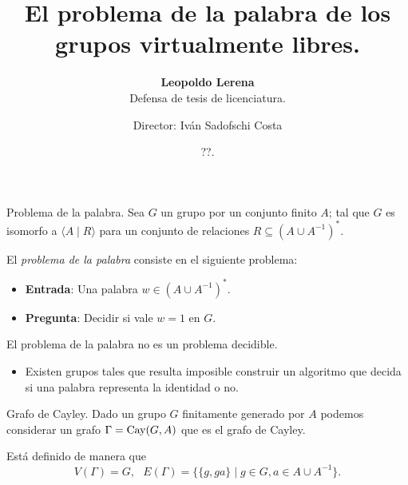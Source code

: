 \documentclass[aspectratio=169, 11pt]{beamer}
\title{El problema de la palabra de los grupos virtualmente libres.}
\subtitle{\textbf{Leopoldo Lerena} \\
		Defensa de tesis de licenciatura.}
\date{??.}
\author{Director: Iván Sadofschi Costa}
\institute{Universidad de Buenos Aires}
\begin{document}
	\maketitle

	
	
	
	\begin{frame}[fragile]{Problema de la palabra.}
		Sea $G$ un grupo \fg por un conjunto finito $A$; 
		tal que $G$ es isomorfo a $\langle A \mid R \rangle$ para un conjunto de relaciones $R \subseteq (A \cup A^{-1})^*$.
		
		El \emph{problema de la palabra} consiste en el siguiente problema:
	
		\begin{itemize}
					\item 
						\textbf{Entrada}: Una palabra $w \in (A \cup A^{-1})^*$.
					
					\item 
						\textbf{Pregunta}: Decidir si vale $w=1$ en $G$.
		\end{itemize}

		El problema de la palabra no es un problema \alert{decidible}.
		\begin{itemize}
			\item 
				Existen grupos tales que resulta imposible construir un algoritmo que decida si una palabra representa la identidad o no.
		\end{itemize}
		

	\end{frame}

	\begin{frame}[fragile]{Grafo de Cayley.}
		Dado un grupo $G$ finitamente generado por $A$ podemos considerar un grafo $\Gamma =\text{Cay}(G, A)$ que es el grafo de Cayley.

		Está definido de manera que 
		\[
			V(\Gamma) = G,   \ \ \ E(\Gamma) = \{ \{ g,ga \}  \mid g \in G, a \in A \cup A^{-1}  \}. 	
		\]

	\end{frame}
	
\end{document}
